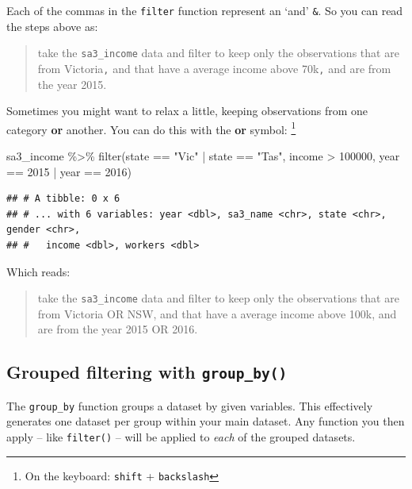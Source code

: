 \documentclass[
]{book}
\newenvironment{Shaded}{\begin{snugshade}}{\end{snugshade}}
\newcommand{\DecValTok}[1]{\textcolor[rgb]{0.00,0.00,0.81}{#1}}
\newcommand{\FunctionTok}[1]{\textcolor[rgb]{0.00,0.00,0.00}{#1}}
\newcommand{\NormalTok}[1]{#1}
\newcommand{\SpecialCharTok}[1]{\textcolor[rgb]{0.00,0.00,0.00}{#1}}
\newcommand{\StringTok}[1]{\textcolor[rgb]{0.31,0.60,0.02}{#1}}
\begin{document}
Each of the commas in the \texttt{filter} function represent an `and' \texttt{\&}. So you can read the steps above as:

\begin{quote}
take the \texttt{sa3\_income} data and filter to keep only the observations that are from Victoria\texttt{,} and that have a average income above 70k\texttt{,} and are from the year 2015.
\end{quote}

Sometimes you might want to relax a little, keeping observations from one category \textbf{or} another. You can do this with the \textbf{or} symbol: \texttt{\textbar{}}\footnote{On the keyboard: \texttt{shift} + \texttt{backslash}}

\begin{Shaded}
\begin{Highlighting}[]
\NormalTok{sa3\_income }\SpecialCharTok{\%\textgreater{}\%} 
  \FunctionTok{filter}\NormalTok{(state }\SpecialCharTok{==} \StringTok{"Vic"} \SpecialCharTok{|}\NormalTok{ state }\SpecialCharTok{==} \StringTok{"Tas"}\NormalTok{,}
\NormalTok{         income }\SpecialCharTok{\textgreater{}} \DecValTok{100000}\NormalTok{,}
\NormalTok{         year }\SpecialCharTok{==} \DecValTok{2015} \SpecialCharTok{|}\NormalTok{ year }\SpecialCharTok{==} \DecValTok{2016}\NormalTok{)}
\end{Highlighting}
\end{Shaded}

\begin{verbatim}
## # A tibble: 0 x 6
## # ... with 6 variables: year <dbl>, sa3_name <chr>, state <chr>, gender <chr>,
## #   income <dbl>, workers <dbl>
\end{verbatim}

Which reads:

\begin{quote}
take the \texttt{sa3\_income} data and filter to keep only the observations that are from Victoria OR NSW, and that have a average income above 100k, and are from the year 2015 OR 2016.
\end{quote}

\hypertarget{grouped-filtering-with-group_by}{%
\subsection{\texorpdfstring{Grouped filtering with \texttt{group\_by()}}{Grouped filtering with group\_by()}}\label{grouped-filtering-with-group_by}}

The \texttt{group\_by} function groups a dataset by given variables. This effectively generates one dataset per group within your main dataset. Any function you then apply -- like \texttt{filter()} -- will be applied to \emph{each} of the grouped datasets.
\end{document}
